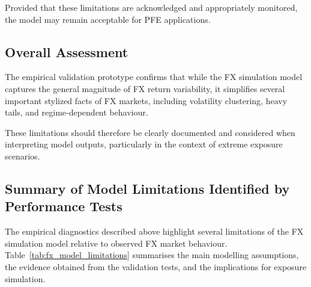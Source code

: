 Provided that these limitations are acknowledged and appropriately monitored, the model may remain acceptable for PFE applications.

\subsection{Overall Assessment}

The empirical validation prototype confirms that while the FX simulation model captures the general magnitude of FX return variability, it simplifies several important stylized facts of FX markets, including volatility clustering, heavy tails, and regime-dependent behaviour.

These limitations should therefore be clearly documented and considered when interpreting model outputs, particularly in the context of extreme exposure scenarios.


\subsection{Summary of Model Limitations Identified by Performance Tests}

The empirical diagnostics described above highlight several limitations of the FX simulation model relative to observed FX market behaviour. Table~\ref{tab:fx_model_limitations} summarises the main modelling assumptions, the evidence obtained from the validation tests, and the implications for exposure simulation.

